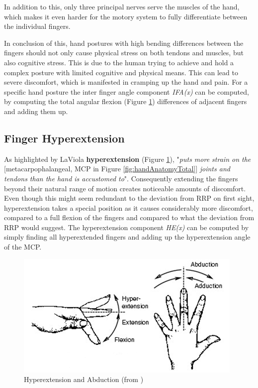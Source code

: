 In addition to this, only three principal nerves serve the muscles of the hand, which makes it even harder for the motory system to fully differentiate between the individual fingers.

In conclusion of this, hand postures with high bending differences between the fingers should not only cause physical stress on both tendons and muscles, but also cognitive stress. This is due to the human trying to achieve and hold a complex posture with limited cognitive and physical means.
This can lead to severe discomfort, which is manifested in cramping up the hand and pain.
For a specific hand posture the inter finger angle component \textit{IFA(x)} can be computed, by computing the total angular flexion (Figure \ref{fig:hyperabduction}) differences of adjacent fingers and adding them up.

\subsection{Finger Hyperextension}

As highlighted by LaViola \cite{laviola1999survey} \textbf{hyperextension} (Figure \ref{fig:hyperabduction}), "\textit{puts more strain on the }[metacarpophalangeal, MCP in Figure \ref{fig:handAnatomyTotal}] \textit{joints and tendons than the hand is accustomed to}". Consequently extending the fingers beyond their natural range of motion creates noticeable amounts of discomfort. Even though this might seem redundant to the deviation from RRP on first sight, hyperextension takes a special position as it causes considerably more discomfort, compared to a full flexion of the fingers and compared to what the deviation from RRP would suggest. The hyperextension component \textit{HE(x)} can be computed by simply finding all hyperextended fingers and adding up the hyperextension angle of the MCP. 

\begin{figure}
\centering
\includegraphics[width=\textwidth]{abduction}
\caption{Hyperextension and Abduction (from \cite{laviola1999survey})}
\label{fig:hyperabduction}
\end{figure}

